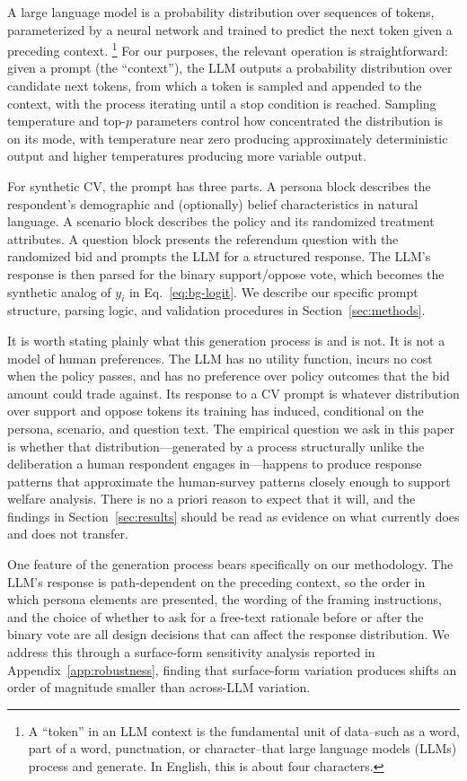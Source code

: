 \documentclass[12pt]{article}
\begin{document}
A large language model is a probability distribution over sequences of
tokens, parameterized by a neural network and trained to predict the next
token given a preceding context.
\footnote{A ``token'' in an LLM context is the fundamental unit of data--such as a word, part of a word, punctuation, or character--that large language models (LLMs) process and generate. In English, this is about four characters.} 
For our purposes, the relevant operation
is straightforward: given a prompt (the ``context''), the LLM outputs a
probability distribution over candidate next tokens, from which a token
is sampled and appended to the context, with the process iterating until
a stop condition is reached. Sampling temperature and top-$p$ parameters
control how concentrated the distribution is on its mode, with temperature
near zero producing approximately deterministic output and higher
temperatures producing more variable output.

For synthetic CV, the prompt has three parts. A persona block describes
the respondent's demographic and (optionally) belief characteristics in
natural language. A scenario block describes the policy and its randomized
treatment attributes. A question block presents the referendum question
with the randomized bid and prompts the LLM for a structured response.
The LLM's response is then parsed for the binary support/oppose vote,
which becomes the synthetic analog of $y_i$ in
Eq.~\ref{eq:bg-logit}. We describe our specific prompt structure, parsing
logic, and validation procedures in Section~\ref{sec:methods}.

It is worth stating plainly what this generation process is and is not.
It is not a model of human preferences. The LLM has no utility function,
incurs no cost when the policy passes, and has no preference over policy
outcomes that the bid amount could trade against. Its response to a CV
prompt is whatever distribution over support and oppose tokens its
training has induced, conditional on the persona, scenario, and question
text. The empirical question we ask in this paper is whether that
distribution---generated by a process structurally unlike the
deliberation a human respondent engages in---happens to produce response
patterns that approximate the human-survey patterns closely enough to
support welfare analysis. There is no a priori reason to expect that it
will, and the findings in Section~\ref{sec:results} should be read as
evidence on what currently does and does not transfer.

One feature of the generation process bears specifically on our
methodology. The LLM's response is path-dependent on the preceding
context, so the order in which persona elements are presented, the
wording of the framing instructions, and the choice of whether to ask for
a free-text rationale before or after the binary vote are all design
decisions that can affect the response distribution. We address this
through a surface-form sensitivity analysis reported in
Appendix~\ref{app:robustness}, finding that surface-form variation produces
shifts an order of magnitude smaller than across-LLM variation.
\end{document}
